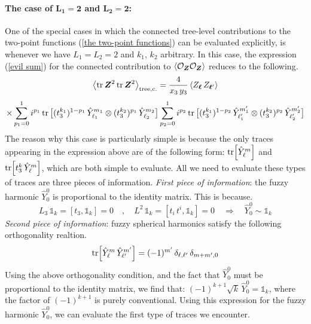 \paragraph[The case of $L_1 = 2$ and $L_2 = 2$]{The case of $\mathbf{L_1 = 2}$ and $\mathbf{L_2 = 2}$:}
One of the special cases in which the connected tree-level contributions to the two-point functions (\ref{the two-point functions}) can be evaluated explicitly, is whenever we have $L_1 = L_2 = 2$ and $k_1$, $k_2$ arbitrary. In this case, the expression (\ref{evil sum}) for the connected contribution to $\expval{\mathcal{O}_{\boldsymbol{Z}} \mathcal{O}_{\boldsymbol{Z}}}$ reduces to the following.
%
%
\begin{equation*}\label{connected contribution ZZ L1=L2=1}
\expval{\tr \boldsymbol{Z}^2 \tr \boldsymbol{Z}^2}_{\mathrm{tree,c.}}
=
\frac{4}{x_3 \, y_3}
\expval{
Z_{\boldsymbol{\ell}} \,
Z_{\boldsymbol{\ell}'}
}
\end{equation*}
%
%
\begin{equation}
\times
\sum_{p_1=0}^{1} i^{p_1}
\tr \big[ (t_3^{k_1})^{1 - p_1} \, \hat{Y}_{\ell_1}^{m_1}
\otimes
(t_3^{k_2})^{p_1} \, \hat{Y}_{\ell_2}^{m_2} \big]
\sum_{p_2=0}^{1} i^{p_2}
\tr \big[ (t_3^{k_1})^{1 - p_2} \, \hat{Y}_{\ell_1'}^{m_1'}
\otimes
(t_3^{k_2})^{p_2} \, \hat{Y}_{\ell_2'}^{m_2'} \big]
\end{equation}
%
%
The reason why this case is particularly simple is because the only traces appearing in the expression above are of the following form: $\tr[\hat{Y}_\ell^m]$ and $\tr[t_3^{k} \, \hat{Y}_\ell^m]$, which are both simple to evaluate. All we need to evaluate these types of traces are three pieces of information. \textit{First piece of information}: the fuzzy harmonic $\hat{Y}^0_0$ is proportional to the identity matrix. This is because.
%
%
\begin{equation}
L_3 \, \mathbb{1}_k = [t_3, \mathbb{1}_k] = 0
%
\quad , \quad
%
L^2 \, \mathbb{1}_k = [t_i \, t^i, \mathbb{1}_k] = 0
%
\quad \Rightarrow \quad
%
\hat{Y}^0_0 \sim \mathbb{1}_k
\end{equation}
%
%
\textit{Second piece of information}: fuzzy spherical harmonics satisfy the following orthogonality realtion.
%
%
\begin{equation}\label{fuzzy harmonic orthogonality}
\tr[ \hat{Y}_{\ell}^{m} \, \hat{Y}_{\ell'}^{m'} ]
=
(-1)^{m'} \, \delta_{\ell, \ell'} \, \delta_{m + m',0}
\end{equation}
%
%
Using the above orthogonality condition, and the fact that $\hat{Y}^0_0$ must be proportional to the identity matrix, we find that: $(-1)^{k+1} \sqrt{k} \, \hat{Y}^0_0 = \mathbb{1}_k$, where the factor of $(-1)^{k+1}$ is purely conventional. Using this expression for the fuzzy harmonic $\hat{Y}^0_0$, we can evaluate the first type of traces we encounter.

